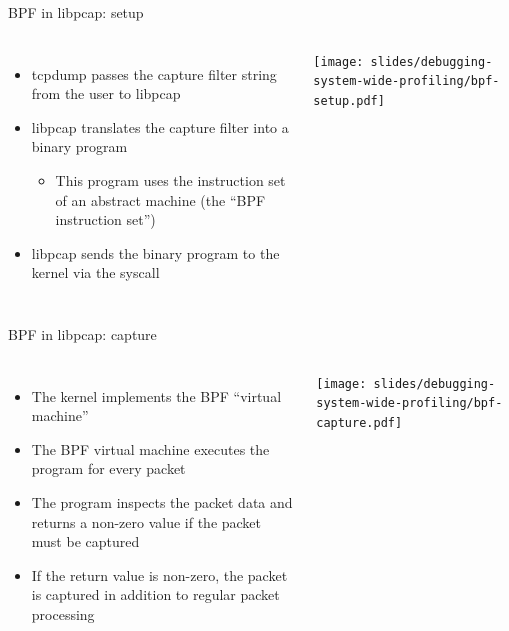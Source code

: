 \begin{frame}{BPF in libpcap: setup}
  \begin{columns}
    \begin{itemize}
    \item tcpdump passes the capture filter string from the user to libpcap
    \item libpcap translates the capture filter into a binary program
      \begin{itemize}
      \item This program uses the instruction set of an abstract machine
        (the ``BPF instruction set'')
      \end{itemize}
    \item libpcap sends the binary program to the kernel via the
       syscall
    \end{itemize}
      \texttt{[image: slides/debugging-system-wide-profiling/bpf-setup.pdf]}
  \end{columns}
\end{frame}

\begin{frame}{BPF in libpcap: capture}
  \begin{columns}
    \begin{itemize}
    \item The kernel implements the BPF ``virtual machine''
    \item The BPF virtual machine executes the program for every packet
    \item The program inspects the packet data and returns a non-zero value
      if the packet must be captured
    \item If the return value is non-zero, the packet is captured in
      addition to regular packet processing
    \end{itemize}
      \texttt{[image: slides/debugging-system-wide-profiling/bpf-capture.pdf]}
  \end{columns}
\end{frame}

